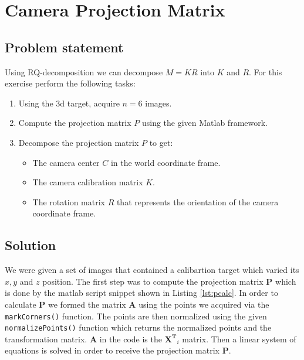 \documentclass[
a4paper,     %
11pt         %
]{scrartcl}  %
\begin{document}
\FloatBarrier
\section{Camera Projection Matrix}

\subsection{Problem statement}

Using RQ-decomposition we can decompose $M = KR$ into $K$ and $R$.
For this exercise perform the following tasks:

\begin{enumerate}
 \item Using the 3d target, acquire $n = 6$ images.
 \item Compute the projection matrix $P$ using the given Matlab framework.
 \item Decompose the projection matrix $P$ to get:
 \begin{itemize}
  \item The camera center $C$ in the world coordinate frame.
  \item The camera calibration matrix $K$.
  \item The rotation matrix $R$ that represents the orientation of the camera coordinate frame.
 \end{itemize}
\end{enumerate}

\subsection{Solution}

We were given a set of images that contained a calibartion target which varied its $x,y$ and $z$ position.
The first step was to compute the projection matrix $\mathbf{P}$ which is done by the matlab script snippet shown in Listing \ref{lst:pcalc}.
In order to calculate $\mathbf{P}$ we formed the matrix $\mathbf{A}$ using the points we acquired via the \lstinline{markCorners()} function.
The points are then normalized using the given \lstinline{normalizePoints()} function which returns the normalized points and the transformation matrix.
$\mathbf{A}$ in the code is the $\mathbf{X^T}_i$ matrix.
Then a linear system of equations is solved in order to receive the projection matrix $\mathbf{P}$.
\end{document}

